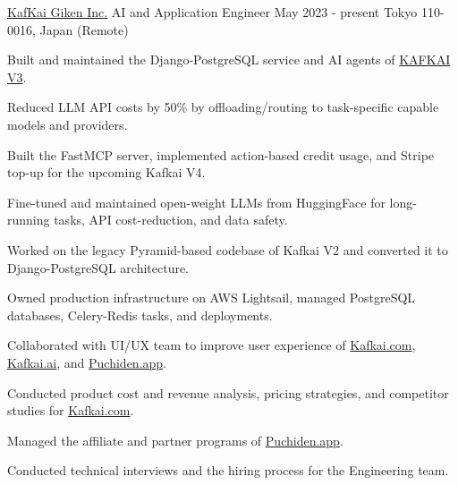 \begin{cventries}



\cventry
    {\href{https://kafkai.com/}{KafKai Giken Inc.}} %
    {AI and Application Engineer} %
    {May 2023 - present} %
    {Tokyo 110-0016, Japan (Remote)} %
    {
      \begin{cvitems} %
        \item{Built and maintained the Django-PostgreSQL service and AI agents of \href{https://kafkai.com/}{\textcolor{Cerulean}{KAFKAI V3}}.}
        \item{Reduced LLM API costs by 50\% by offloading/routing to task-specific capable models and providers.}
        \item{Built the FastMCP server, implemented action-based credit usage, and Stripe top-up for the upcoming Kafkai V4.}
        \item{Fine-tuned and maintained open-weight LLMs from HuggingFace for long-running tasks, API cost-reduction, and data safety.}
        \item{Worked on the legacy Pyramid-based codebase of Kafkai V2 and converted it to Django-PostgreSQL architecture.}
        \item{Owned production infrastructure on AWS Lightsail, managed PostgreSQL databases, Celery-Redis tasks, and deployments.}
        \item{Collaborated with UI/UX team to improve user experience of \href{https://kafkai.com/}{\textcolor{Cerulean}{Kafkai.com}}, \href{https://kafkai.ai/}{\textcolor{Cerulean}{Kafkai.ai}}, and \href{https://puchiden.app/}{\textcolor{Cerulean}{Puchiden.app}}.}
        \item{Conducted product cost and revenue analysis, pricing strategies, and competitor studies for \href{https://kafkai.com/}{\textcolor{Cerulean}{Kafkai.com}}.}
        \item{Managed the affiliate and partner programs of \href{https://puchiden.app/}{\textcolor{Cerulean}{Puchiden.app}}.}
        \item{Conducted technical interviews and the hiring process for the Engineering team.}
      \end{cvitems}
    }



\end{cventries}
